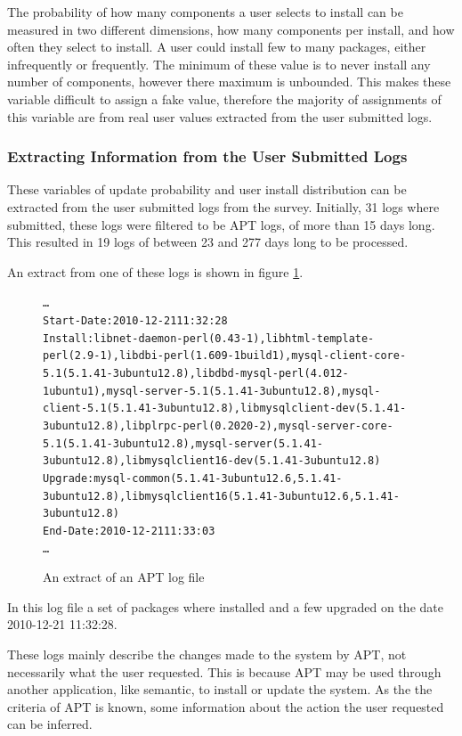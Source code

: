 The probability of how many components a user selects to install can be measured in two different dimensions, how many components per install, and how often they select to install.
A user could install few to many packages, either infrequently or frequently.
The minimum of these value is to never install any number of components, however there maximum is unbounded.
This makes these variable difficult to assign a fake value, therefore the majority of assignments of this variable are from real user values extracted from the user submitted logs.

\subsubsection{Extracting Information from the User Submitted Logs}
These variables of update probability and user install distribution can be extracted from the user submitted logs from the survey.
Initially, 31 logs where submitted, these logs were filtered to be APT logs, of more than 15 days long.
This resulted in 19 logs of between 23 and 277 days long to be processed.

An extract from one of these logs is shown in figure \ref{aptlog}.

\begin{figure}[htp]
\begin{center}
\begin{alltt}
\ldots
Start-Date: 2010-12-21 11:32:28
Install: libnet-daemon-perl (0.43-1), libhtml-template-perl (2.9-1), libdbi-perl (1.609-1build1), mysql-client-core-5.1 (5.1.41-3ubuntu12.8), libdbd-mysql-perl (4.012-1ubuntu1), mysql-server-5.1 (5.1.41-3ubuntu12.8), mysql-client-5.1 (5.1.41-3ubuntu12.8), libmysqlclient-dev (5.1.41-3ubuntu12.8), libplrpc-perl (0.2020-2), mysql-server-core-5.1 (5.1.41-3ubuntu12.8), mysql-server (5.1.41-3ubuntu12.8), libmysqlclient16-dev (5.1.41-3ubuntu12.8)
Upgrade: mysql-common (5.1.41-3ubuntu12.6, 5.1.41-3ubuntu12.8), libmysqlclient16 (5.1.41-3ubuntu12.6, 5.1.41-3ubuntu12.8)
End-Date: 2010-12-21 11:33:03
\ldots
\end{alltt}
\caption[APT log extract]{An extract of an APT log file}
\label{aptlog}
\end{center}
\end{figure}

In this log file a set of packages where installed and a few upgraded on the date 2010-12-21 11:32:28. 

These logs mainly describe the changes made to the system by APT, not necessarily what the user requested.
This is because APT may be used through another application, like semantic, to install or update the system.
As the the criteria of APT is known, some information about the action the user requested can be inferred.

